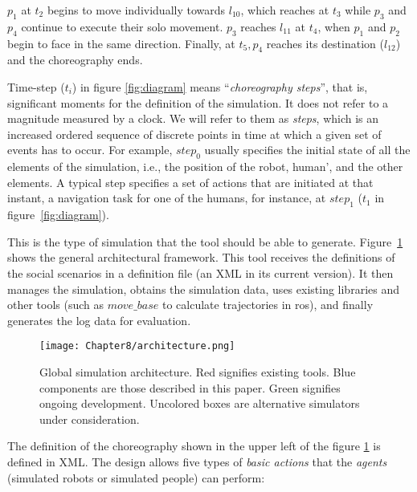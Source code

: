 $p_1$ at $t_2$ begins to move individually towards $l_{10}$, which reaches at $t_3$ while $p_3$ and $p_4$ continue to execute their solo movement. $p_3$ reaches $l_{11}$ at $t_4$, when $p_1$ and $p_2$ begin to face in the same direction. Finally, at $t_5, p_4$ reaches its destination ($l_{12}$) and the choreography ends.

Time-step ($t_i$) in figure \ref{fig:diagram} means ``\emph{choreography steps}'', that is, significant moments for the definition of the simulation. It does not refer to a magnitude measured by a clock. We will refer to them as \emph{steps}, which is an increased ordered sequence of discrete points in time at which a given set of events has to occur. For example, $step_0$ usually specifies the initial state of all the elements of the simulation, i.e., the position of the robot, human', and the other elements. A typical step specifies a set of actions that are initiated at that instant, a navigation task for one of the humans, for instance, at $step_1$ ($t_1$ in figure~\ref{fig:diagram}).


This is the type of simulation that the tool should be able to generate. Figure~\ref{fig:imhus_architecture} shows the general architectural framework. This tool receives the definitions of the social scenarios in a definition file (an XML in its current version). It then manages the simulation, obtains the simulation data, uses existing libraries and other tools (such as $move\_base$ to calculate trajectories in \acrshort{ros}), and finally generates the log data for evaluation.

\begin{figure}[h!]%
    \centering
    \texttt{[image: Chapter8/architecture.png]}
    \caption{Global simulation architecture. Red signifies existing tools. Blue components are those described in this paper. Green signifies ongoing development. Uncolored boxes are alternative simulators under consideration.}
    \label{fig:imhus_architecture}
\end{figure}

The definition of the choreography shown in the upper left of the figure \ref{fig:imhus_architecture} is defined in XML. The design allows five types of \emph{basic actions} that the \emph{agents} (simulated robots or simulated people) can perform:

